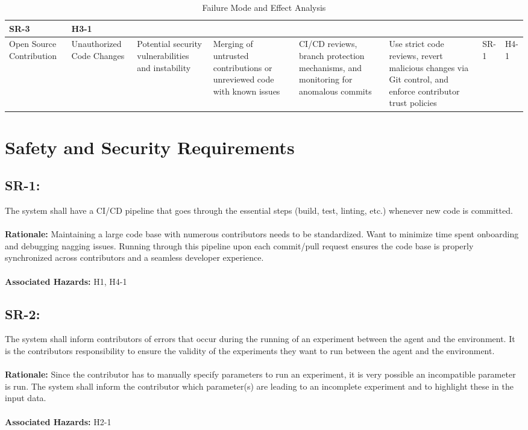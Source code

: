 \documentclass{article}
\begin{document}
\begin{landscape}
\begin{table}[ht]
{\begin{tabular}{|p{2cm}|p{3cm}|p{4cm}|p{4cm}|p{3cm}|p{4cm}|p{2cm}|p{2cm}|}
       SR-3 & H3-1 \\
       \hline
       Open Source Contribution &
       Unauthorized Code Changes &
       Potential security vulnerabilities and instability &
       Merging of untrusted contributions or unreviewed code with known issues &
       CI/CD reviews, branch protection mechanisms, and monitoring for anomalous commits &
       Use strict code reviews, revert malicious changes via Git control, and enforce contributor
       trust policies &
       SR-1 & H4-1 \\
       \hline
       \end{tabular}%
       } %
       \caption{Failure Mode and Effect Analysis}
       \label{table:fmea}
    \end{table}
\end{landscape}


\section{Safety and Security Requirements}

\subsection*{SR-1:}
\label{SR-1}
The system shall have a CI/CD pipeline that goes through the essential steps (build, test, linting, etc.) whenever new code is committed. \\ \\
\textbf{Rationale:} Maintaining a large code base with numerous contributors needs to be standardized. Want to minimize time spent onboarding and debugging nagging issues. Running through this pipeline upon each commit/pull request ensures the code base is properly synchronized across contributors and a seamless developer experience. \\ \\
\textbf{Associated Hazards:} H1, H4-1

\subsection*{SR-2:}
\label{SR-2}
The system shall inform contributors of errors that occur during the running of an experiment between the agent and the environment. It is the contributors responsibility to ensure the validity of the experiments they want to run between the agent and the environment. \\ \\ 
\textbf{Rationale:} Since the contributor has to manually specify parameters to run an experiment, it is very possible an incompatible parameter is run. The system shall inform the contributor which parameter(s) are leading to an incomplete experiment and to highlight these in the input data. \\ \\ 
\textbf{Associated Hazards:} H2-1
\end{document}
